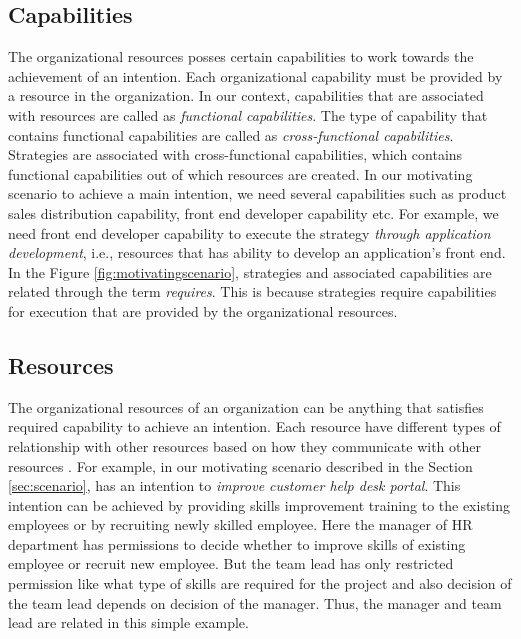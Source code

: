 \subsection{Capabilities}
\label{sec:capabilities}
The organizational resources posses certain capabilities to work towards the achievement of an intention. Each organizational capability must be provided by a resource in the organization. In our context, capabilities that are associated with resources are called as \textit{functional capabilities}. The type of capability that contains functional capabilities are called as \textit{cross-functional capabilities}. Strategies are associated with cross-functional capabilities, which contains functional capabilities out of which resources are created. In our motivating scenario to achieve a main intention, we need several capabilities such as product sales distribution capability, front end developer capability etc. For example, we need front end developer capability to execute the strategy \textit{through application development}, i.e., resources that has ability to develop an application's front end. In the Figure \ref{fig:motivatingscenario}, strategies and associated capabilities are related through the term \textit{requires}. This is because strategies require capabilities for execution that are provided by the organizational resources. 

\subsection{Resources} 
\label{sec:resources}
The organizational resources of an organization can be anything that satisfies required capability to achieve an intention. Each resource have different types of relationship with other resources based on how they communicate with other resources \cite{Sungur2015}. For example, in our motivating scenario described in the Section \ref{sec:scenario}, has an intention to \textit{improve customer help desk portal}. This intention can be achieved by providing skills improvement training to the existing employees or by recruiting newly skilled employee. Here the manager of HR department has permissions to decide whether to improve skills of existing employee or recruit new employee. But the team lead has only restricted permission like what type of skills are required for the project and also decision of the team lead depends on decision of the manager. Thus, the manager and team lead are related in this simple example. 
